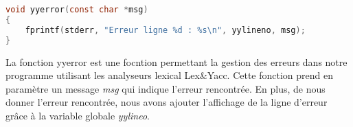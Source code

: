 \lstset{style=mystyle}
\begin{lstlisting}[language=C, caption=Message d'erreur]
void yyerror(const char *msg)
{
    fprintf(stderr, "Erreur ligne %d : %s\n", yylineno, msg);
}

\end{lstlisting}

La fonction yyerror est une focntion permettant la gestion des erreurs dans notre programme utilisant les analyseurs lexical Lex&Yacc. 
Cette fonction prend en paramètre un message \textit{msg} qui indique l'erreur rencontrée. En plus, de nous donner l'erreur rencontrée, nous avons ajouter l'affichage de la ligne d'erreur grâce à la variable globale \textit{yylineo}.

\newpage